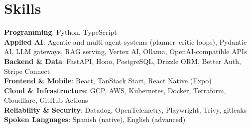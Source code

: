 \section{Skills}
 \begin{itemize}[leftmargin=0.15in, label={}]
    \small{\item{
     \textbf{Programming}{: Python, TypeScript} \\
     \textbf{Applied AI}{: Agentic and multi-agent systems (planner--critic loops), Pydantic AI, LLM gateways, RAG serving, Vertex AI, Ollama, OpenAI-compatible APIs} \\
     \textbf{Backend \& Data}{: FastAPI, Hono, PostgreSQL, Drizzle ORM, Better Auth, Stripe Connect} \\
     \textbf{Frontend \& Mobile}{: React, TanStack Start, React Native (Expo)} \\
     \textbf{Cloud \& Infrastructure}{: GCP, AWS, Kubernetes, Docker, Terraform, Cloudflare, GitHub Actions} \\
     \textbf{Reliability \& Security}{: Datadog, OpenTelemetry, Playwright, Trivy, gitleaks} \\
     \textbf{Spoken Languages}{: Spanish (native), English (advanced)}
    }}
 \end{itemize}
